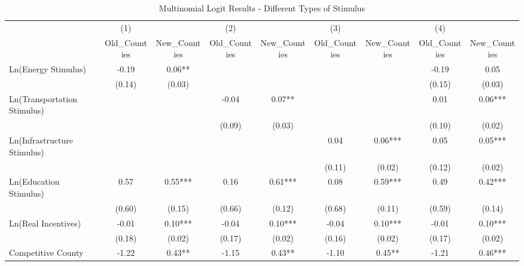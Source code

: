 \begin{table}[!htbp]\centering
\def\sym#1{\ifmmode^{#1}\else\(^{#1}\)\fi}
\caption{Multinomial Logit Results - Different Types of Stimulus}
\begin{tabular}{l*{8}{c}}
\hline\hline
                    &         (1)   &               &         (2)   &               &         (3)   &               &         (4)   &               \\
                    &Old_Counties   &New_Counties   &Old_Counties   &New_Counties   &Old_Counties   &New_Counties   &Old_Counties   &New_Counties   \\
\hline
Ln(Energy Stimulus) &       -0.19   &        0.06** &               &               &               &               &       -0.19   &        0.05   \\
                    &      (0.14)   &      (0.03)   &               &               &               &               &      (0.15)   &      (0.03)   \\
Ln(Transportation Stimulus)&               &               &       -0.04   &        0.07** &               &               &        0.01   &        0.06***\\
                    &               &               &      (0.09)   &      (0.03)   &               &               &      (0.10)   &      (0.02)   \\
Ln(Infrastructure Stimulus)&               &               &               &               &        0.04   &        0.06***&        0.05   &        0.05***\\
                    &               &               &               &               &      (0.11)   &      (0.02)   &      (0.12)   &      (0.02)   \\
Ln(Education Stimulus)&        0.57   &        0.55***&        0.16   &        0.61***&        0.08   &        0.59***&        0.49   &        0.42***\\
                    &      (0.60)   &      (0.15)   &      (0.66)   &      (0.12)   &      (0.68)   &      (0.11)   &      (0.59)   &      (0.14)   \\
Ln(Real Incentives) &       -0.01   &        0.10***&       -0.04   &        0.10***&       -0.04   &        0.10***&       -0.01   &        0.10***\\
                    &      (0.18)   &      (0.02)   &      (0.17)   &      (0.02)   &      (0.16)   &      (0.02)   &      (0.17)   &      (0.02)   \\
Competitive County  &       -1.22   &        0.43** &       -1.15   &        0.43** &       -1.10   &        0.45** &       -1.21   &        0.46***\\

\end{tabular}
\end{table}
